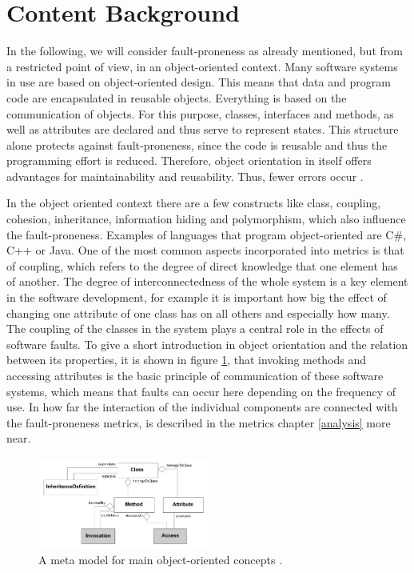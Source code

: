 \section{Content Background}\label{content}

In the following, we will consider fault-proneness as already mentioned, but from a restricted point of view, in an object-oriented context. Many software systems in use are based on object-oriented design. This means that data and program code are encapsulated in reusable objects. Everything is based on the communication of objects. For this purpose, classes, interfaces and methods, as well as attributes are declared and thus serve to represent states. This structure alone protects against fault-proneness, since the code is reusable and thus the programming effort is reduced. Therefore, object orientation in itself offers advantages for maintainability and reusability. Thus, fewer errors occur \cite{fichman1993adoption, lanza2002beyond}. 

In the object oriented context there are a few constructs like class, coupling, cohesion, inheritance, information hiding and polymorphism, which also influence the fault-proneness. Examples of languages that program object-oriented are C\#, C++ or Java.
One of the most common aspects incorporated into metrics is that of coupling, which refers to the degree of direct knowledge that one element has of another. The degree of interconnectedness of the whole system is a key element in the software development, for example it is important how big the effect of changing one attribute of one class has on all others and especially how many.
The coupling of the classes in the system plays a central role in the effects of software faults.
To give a short introduction in object orientation and the relation between its properties, it is shown in figure \ref{fig0}, that invoking methods and accessing attributes is the basic principle of communication of these software systems, which means that faults can occur here depending on the frequency of use. In how far the interaction of the individual components are connected with the fault-proneness metrics, is described in the metrics chapter \ref{analysis} more near.

\begin{figure}[htbp]
	\centerline{\includegraphics[width=0.5\textwidth]{pictures/oodesign.png}}
	\caption{A meta model for main object-oriented concepts \cite{lanza2002beyond}.}
	\label{fig0}
\end{figure}

